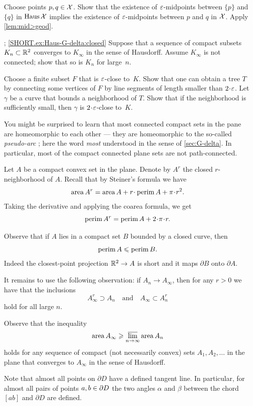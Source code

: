 Choose points $p,q\in\mathcal{X}$. 
Show that the existence of $\varepsilon$-midpoints between $\{p\}$ and $\{q\}$ in $\operatorname{\rm Haus}\nolimits\mathcal{X}$ implies the existence of $\varepsilon$-midpoints between $p$ and $q$ in $\mathcal{X}$.
Apply \ref{lem:mid>geod}.

\parbf{\ref{ex:Haus-G-delta}}; \ref{SHORT.ex:Haus-G-delta:closed}
Suppose that a sequence of compact subsets $K_n\subset \mathbb{R}^2$ converges to $K_\infty$ in the sense of Hausdorff.
Assume $K_\infty$ is not connected; show that so is  $K_n$ for large~$n$.

Choose a finite subset $F$ that is $\varepsilon$-close to~$K$.
Show that one can obtain a tree $T$ by connecting some vertices of $F$ by line segments of length smaller than $2\cdot\eps$.
Let $\gamma$ be a curve that bounds a neighborhood of $T$.
Show that if the neighborhood is sufficiently small, then $\gamma$ is $2\cdot\eps$-close to~$K$.

You might be surprised to learn that most connected compact sets in the pane are homeomorphic to each other --- they are homeomorphic to the so-called \emph{pseudo-arc} \cite{bing-1948}; here the word \textit{most} understood in the sense of \ref{sec:G-delta}.
In particular, most of the compact connected plane sets are not path-connected.


Let $A$ be a compact convex set in the plane.
Denote by $A^r$ the closed $r$-neighborhood of $A$.
Recall that by Steiner's formula we have
\[\area A^r=\area A+r\cdot\perim A+\pi\cdot r^2.\]
Taking the derivative and applying the coarea formula, we get 
\[\perim A^r=\perim A+2\cdot\pi\cdot r.\]

Observe that if $A$ lies in a compact set $B$ bounded by a closed curve, then 
\[\operatorname{\rm perim}\nolimits A\leqslant \operatorname{\rm perim}\nolimits B.\]
Indeed the closest-point projection $\mathbb{R}^2\to A$ is short and it maps $\partial B$ onto $\partial A$.

It remains to use the following observation: if $A_n\to A_\infty$, then for any $r>0$ we have that the inclusions
\[A_\infty^r\supset A_n
\quad\text{and}\quad
A_\infty\subset A_n^r\]
hold for all large $n$.

Observe that the inequality
\[\operatorname{\rm area}\nolimits A_\infty \geqslant \varlimsup_{n \to \infty} \operatorname{\rm area}\nolimits A_n\]
holds for any sequence of compact (not necessarily convex) sets $A_1, A_2, \dots$ in the plane that converges to $A_\infty$ in the sense of Hausdorff.


Note that almost all points on $\partial D$ have a defined tangent line.
In particular, for almost all pairs of points $a,b\z\in\partial D$ the two angles $\alpha$ and $\beta$ between the chord $[ab]$ and $ \partial D$ are defined.

